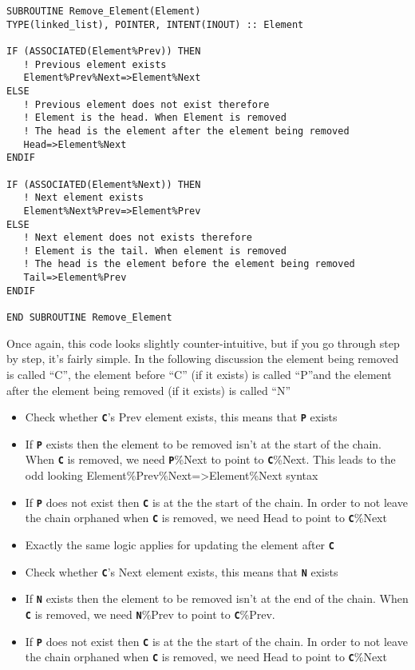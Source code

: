 \documentclass[12pt,a4paper]{article}
\newcommand{\simpleboxverbatim}{\begin{Verbatim}[obeytabs=true,frame=single,
  framerule=0.5mm,rulecolor=\color{warwickmid},formatcom=\color{black}]}
\newcommand{\inlinecode}[1]{{\color{warwickred} \bf\texttt{#1}}}
\begin{document}
\simpleboxverbatim
SUBROUTINE Remove_Element(Element)
TYPE(linked_list), POINTER, INTENT(INOUT) :: Element

IF (ASSOCIATED(Element%Prev)) THEN
   ! Previous element exists
   Element%Prev%Next=>Element%Next
ELSE
   ! Previous element does not exist therefore
   ! Element is the head. When Element is removed
   ! The head is the element after the element being removed
   Head=>Element%Next
ENDIF

IF (ASSOCIATED(Element%Next)) THEN
   ! Next element exists
   Element%Next%Prev=>Element%Prev
ELSE
   ! Next element does not exists therefore
   ! Element is the tail. When element is removed
   ! The head is the element before the element being removed
   Tail=>Element%Prev
ENDIF

END SUBROUTINE Remove_Element
\end{Verbatim}

Once again, this code looks slightly counter-intuitive, but if you go through
step by step, it's fairly simple. In the following discussion the element
being removed is called ``C'', the element before ``C'' (if it exists) is
called ``P''and the element after the element being removed (if it exists) is
called ``N''
\begin{itemize}
\item Check whether \inlinecode{C}'s Prev element exists, this means that
  \inlinecode{P} exists
\item If \inlinecode{P} exists then the element to be removed isn't at the
  start of the chain. When \inlinecode{C} is removed, we need
  \inlinecode{P}\%Next to point to \inlinecode{C}\%Next. This leads to the odd
  looking Element\%Prev\%Next=>Element\%Next syntax
\item If \inlinecode{P} does not exist then \inlinecode{C} is at the the start
  of the chain. In order to not leave the chain orphaned when \inlinecode{C}
  is removed, we need Head to point to \inlinecode{C}\%Next
\item Exactly the same logic applies for updating the element after
  \inlinecode{C}
\item Check whether \inlinecode{C}'s Next element exists, this means that
  \inlinecode{N} exists
\item If \inlinecode{N} exists then the element to be removed isn't at the end
  of the chain. When \inlinecode{C} is removed, we need \inlinecode{N}\%Prev
  to point to \inlinecode{C}\%Prev.
\item If \inlinecode{P} does not exist then \inlinecode{C} is at the the start
  of the chain. In order to not leave the chain orphaned when \inlinecode{C}
  is removed, we need Head to point to \inlinecode{C}\%Next
\end{itemize}
\end{document}
